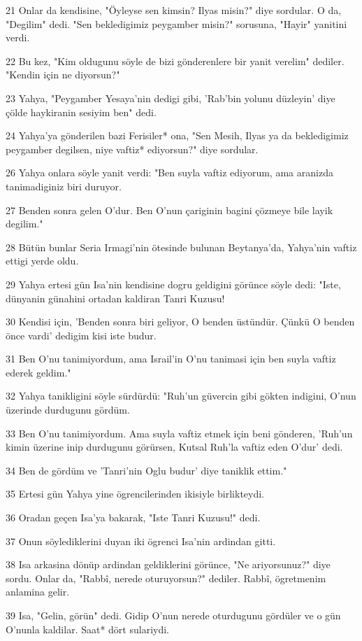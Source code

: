 \par 21 Onlar da kendisine, "Öyleyse sen kimsin? Ilyas misin?" diye sordular. O da, "Degilim" dedi. "Sen bekledigimiz peygamber misin?" sorusuna, "Hayir" yanitini verdi.
\par 22 Bu kez, "Kim oldugunu söyle de bizi gönderenlere bir yanit verelim" dediler. "Kendin için ne diyorsun?"
\par 23 Yahya, "Peygamber Yesaya'nin dedigi gibi, 'Rab'bin yolunu düzleyin' diye çölde haykiranin sesiyim ben" dedi.
\par 24 Yahya'ya gönderilen bazi Ferisiler* ona, "Sen Mesih, Ilyas ya da bekledigimiz peygamber degilsen, niye vaftiz* ediyorsun?" diye sordular.
\par 26 Yahya onlara söyle yanit verdi: "Ben suyla vaftiz ediyorum, ama aranizda tanimadiginiz biri duruyor.
\par 27 Benden sonra gelen O'dur. Ben O'nun çariginin bagini çözmeye bile layik degilim."
\par 28 Bütün bunlar Seria Irmagi'nin ötesinde bulunan Beytanya'da, Yahya'nin vaftiz ettigi yerde oldu.
\par 29 Yahya ertesi gün Isa'nin kendisine dogru geldigini görünce söyle dedi: "Iste, dünyanin günahini ortadan kaldiran Tanri Kuzusu!
\par 30 Kendisi için, 'Benden sonra biri geliyor, O benden üstündür. Çünkü O benden önce vardi' dedigim kisi iste budur.
\par 31 Ben O'nu tanimiyordum, ama Israil'in O'nu tanimasi için ben suyla vaftiz ederek geldim."
\par 32 Yahya tanikligini söyle sürdürdü: "Ruh'un güvercin gibi gökten indigini, O'nun üzerinde durdugunu gördüm.
\par 33 Ben O'nu tanimiyordum. Ama suyla vaftiz etmek için beni gönderen, 'Ruh'un kimin üzerine inip durdugunu görürsen, Kutsal Ruh'la vaftiz eden O'dur' dedi.
\par 34 Ben de gördüm ve 'Tanri'nin Oglu budur' diye taniklik ettim."
\par 35 Ertesi gün Yahya yine ögrencilerinden ikisiyle birlikteydi.
\par 36 Oradan geçen Isa'ya bakarak, "Iste Tanri Kuzusu!" dedi.
\par 37 Onun söylediklerini duyan iki ögrenci Isa'nin ardindan gitti.
\par 38 Isa arkasina dönüp ardindan geldiklerini görünce, "Ne ariyorsunuz?" diye sordu. Onlar da, "Rabbî, nerede oturuyorsun?" dediler. Rabbî, ögretmenim anlamina gelir.
\par 39 Isa, "Gelin, görün" dedi. Gidip O'nun nerede oturdugunu gördüler ve o gün O'nunla kaldilar. Saat* dört sulariydi.
